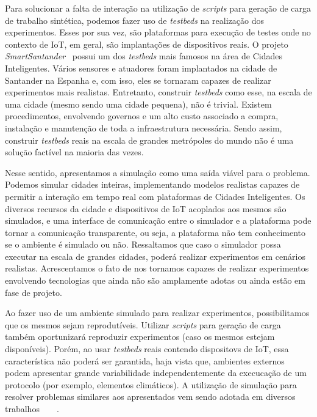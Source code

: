 Para solucionar a falta de interação na utilização de \textit{scripts} para geração de carga de trabalho sintética, podemos fazer uso de \textit{testbeds} na realização dos experimentos.
Esses por sua vez, são plataformas para execução de testes onde no contexto de IoT, em geral, são implantações de dispositivos reais.
O projeto \textit{SmartSantander}~\cite{sanchez_2014} possui um dos \textit{testbeds} mais famosos na área de Cidades Inteligentes.
Vários sensores e atuadores foram implantados na cidade de Santander na Espanha e, com isso, eles se tornaram capazes de realizar experimentos mais realistas.
Entretanto, construir \textit{testbeds} como esse, na escala de uma cidade (mesmo sendo uma cidade pequena), não é trivial.
Existem procedimentos, envolvendo governos e um alto custo associado a compra, instalação e manutenção de toda a infraestrutura necessária.
Sendo assim, construir \textit{testbeds} reais na escala de grandes metrópoles do mundo não é uma solução factível na maioria das vezes.

Nesse sentido, apresentamos a simulação como uma saída viável para o problema.
Podemos simular cidades inteiras, implementando modelos realistas capazes de permitir a interação em tempo real com plataformas de Cidades Inteligentes.
Os diversos recursos da cidade e dispositivos de IoT acoplados aos mesmos são simulados, e uma interface de comunicação entre o simulador e a plataforma pode tornar a comunicação transparente, ou seja,
a plataforma não tem conhecimento se o ambiente é simulado ou não.
Ressaltamos que caso o simulador possa executar na escala de grandes cidades, poderá realizar experimentos em cenários realistas.
Acrescentamos o fato de nos tornamos capazes de realizar experimentos envolvendo tecnologias que ainda não são amplamente adotas ou ainda estão em fase de projeto.

Ao fazer uso de um ambiente simulado para realizar experimentos, possibilitamos que os mesmos sejam reprodutíveis.
Utilizar \textit{scripts} para geração de carga também oportunizará reproduzir experimentos (caso os mesmos estejam disponíveis).
Porém, ao usar \textit{testbeds} reais contendo dispositovs de IoT, essa característica não poderá ser garantida, haja vista que, ambientes externos podem apresentar grande variabilidade independentemente da
execucação de um protocolo (por exemplo, elementos climáticos).
A utilização de simulação para resolver problemas similares aos apresentados vem sendo adotada em diversos trabalhos~\cite{karnouskos_2009}~\cite{fleischer_1994}~\cite{dupuy_1990}~\cite{boukerche_2001}.

